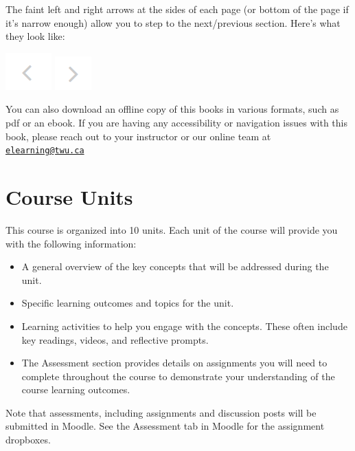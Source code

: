 \documentclass[
]{book}
\providecommand{\tightlist}{%
  \setlength{\itemsep}{0pt}\setlength{\parskip}{0pt}}
\begin{document}
The faint left and right arrows at the sides of each page (or bottom of the page if it's narrow enough) allow you to step to the next/previous section. Here's what they look like:

\includegraphics{assets/course-intro/left_arrow.png} \includegraphics{assets/course-intro/right_arrow.png}

You can also download an offline copy of this books in various formats, such as pdf or an ebook. If you are having any accessibility or navigation issues with this book, please reach out to your instructor or our online team at \href{mailto:elearning@twu.ca}{\nolinkurl{elearning@twu.ca}}

\hypertarget{course-units}{%
\section*{Course Units}\label{course-units}}

This course is organized into 10 units. Each unit of the course will provide you with the following information:

\begin{itemize}
\tightlist
\item
  A general overview of the key concepts that will be addressed during the unit.
\item
  Specific learning outcomes and topics for the unit.
\item
  Learning activities to help you engage with the concepts. These often include key readings, videos, and reflective prompts.
\item
  The Assessment section provides details on assignments you will need to complete throughout the course to demonstrate your understanding of the course learning outcomes.
\end{itemize}

\begin{caution}
Note that assessments, including assignments and discussion posts will be submitted in Moodle. See the Assessment tab in Moodle for the assignment dropboxes.
\end{caution}
\end{document}

